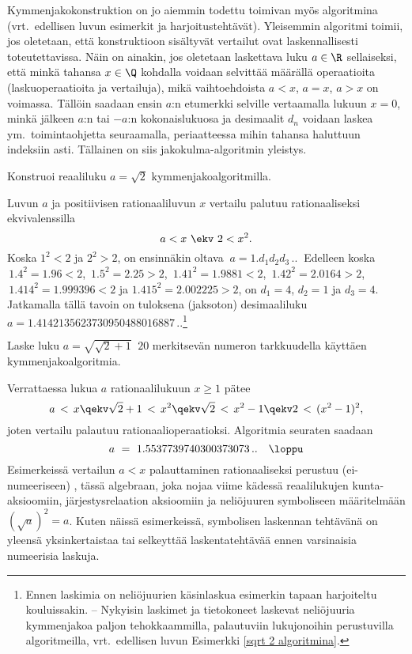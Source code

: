 Kymmenjakokonstruktion on jo aiemmin todettu toimivan myös algoritmina (vrt.\ edellisen
luvun esimerkit ja harjoitustehtävät). Yleisemmin algoritmi toimii, jos oletetaan, että
konstruktioon sisältyvät vertailut ovat laskennallisesti toteutettavissa. Näin on ainakin,
jos oletetaan laskettava luku $a \in \R$ sellaiseksi, että minkä tahansa 
$x \in \Q$ kohdalla voidaan selvittää  määrällä 
operaatioita (laskuoperaatioita ja vertailuja), mikä vaihtoehdoista $a < x$, $a = x$, $a > x$
on voimassa. Tällöin saadaan ensin $a$:n etumerkki selville vertaamalla lukuun $x=0$, minkä
jälkeen $a$:n tai $-a$:n kokonaislukuosa ja desimaalit $d_n$ voidaan laskea ym.\ toimintaohjetta
seuraamalla, periaatteessa mihin tahansa haluttuun indeksiin asti. Tällainen
 on siis jakokulma-algoritmin yleistys.
\begin{Exa} \label{neliöjuuri 2} Konstruoi reaaliluku $a=\sqrt{2}$ kymmenjakoalgoritmilla.
\end{Exa}
\ratk Luvun $a$ ja positiivisen rationaaliluvun $x$ vertailu palutuu rationaaliseksi
ekvivalenssilla
\[
a<x\ \ekv\ 2<x^2.
\]
Koska $1^2<2$ ja $2^2>2$, on ensinnäkin oltava $\ a = 1.d_1d_2d_3\,..\ $ Edelleen koska
$\,1.4^2 = 1.96 < 2$, $\,1.5^2 = 2.25 > 2$, $\,1.41^2 = 1.9881 < 2$, $\,1.42^2 = 2.0164 > 2$,
$\,1.414^2 = 1.999396 < 2$ ja $1.415^2 = 2.002225 > 2$, on $d_1 = 4$, $d_2=1$ ja $d_3=4$.
Jatkamalla tällä tavoin on tuloksena (jaksoton) desimaaliluku
$a = 1.4142135623730950488016887\,..$\footnote[2]{Ennen laskimia on neliöjuurien käsinlaskua
esimerkin tapaan harjoiteltu kouluissakin. -- Nykyisin laskimet ja tietokoneet laskevat
neliöjuuria kymmenjakoa paljon tehokkaammilla, palautuviin lukujonoihin perustuvilla
algoritmeilla, vrt.\ edellisen luvun Esimerkki \ref{sqrt 2 algoritmina}.} \loppu
\begin{Exa} Laske luku $a = \sqrt{\sqrt{2}+1}\ $ $20$ merkitsevän numeron tarkkuudella käyttäen
kymmenjakoalgoritmia. 
\end{Exa}
\ratk Verrattaessa lukua $a$ rationaalilukuun $x \ge 1$ pätee
\[
a\,<\,x \qekv \sqrt{2} + 1\,<\,x^2 \qekv \sqrt{2}\,<\,x^2 - 1 \qekv 2\,<\,(x^2 - 1)^2,
\]
joten vertailu palautuu rationaalioperaatioksi. Algoritmia seuraten saadaan
\[
a\ =\ 1.5537739740300373073\,.. \quad \loppu
\]
%
Esimerkeissä vertailun $a<x$ palauttaminen rationaaliseksi perustuu  
(ei-numeeriseen) , tässä algebraan, joka nojaa viime kädessä reaalilukujen
kunta-aksioomiin, järjestysrelaation aksioomiin ja neliöjuuren symboliseen määritelmään
$(\sqrt{a})^2 = a$. Kuten näissä esimerkeissä, symbolisen laskennan tehtävänä on yleensä
yksinkertaistaa tai selkeyttää laskentatehtävää ennen varsinaisia numeerisia laskuja.
 
